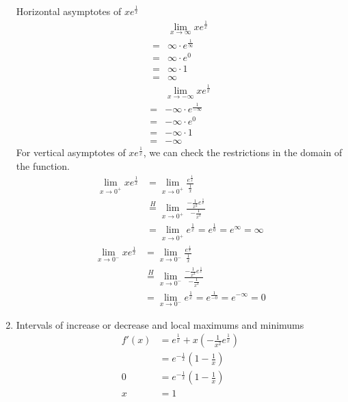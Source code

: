 \documentclass{article}
\theoremstyle{mytheoremstyle}
\theoremstyle{mytheoremstyle}
\theoremstyle{myproblemstyle}
\newcommand\lH{\stackrel{H}{=}}
\begin{document}
\begin{enumerate}
            Horizontal asymptotes of $xe^{\frac{1}{x}}$
            \begin{align*}
                &\lim_{x\to \infty} xe^{\frac{1}{x}} \\
                =& \infty\cdot e^{\frac{1}{\infty}} \\
                =& \infty\cdot e^{0} \\
                =& \infty\cdot 1 \\
                =& \infty
            \end{align*}
            \begin{align*}
                &\lim_{x\to -\infty} xe^{\frac{1}{x}} \\
                =& -\infty\cdot e^{\frac{1}{-\infty}} \\
                =& -\infty\cdot e^{0} \\
                =& -\infty\cdot 1 \\
                =& -\infty
            \end{align*}
            For vertical asymptotes of $xe^{\frac{1}{x}}$, we can check the restrictions
            in the domain of the function.
            \begin{align*}
                \lim_{x\to 0^+} xe^{\frac{1}{x}}
                &= \lim_{x\to 0^+} \frac{e^{\frac{1}{x}}}{\frac{1}{x}} \\
                &\lH\lim_{x\to 0^+} \frac{-\frac{1}{x^2}e^{\frac{1}{x}}}{-\frac{1}{x^2}} \\
                &= \lim_{x\to 0^+} e^{\frac{1}{x}} = e^{\frac{1}{0}} = e^\infty = \infty
            \end{align*}
            \begin{align*}
                \lim_{x\to 0^-} xe^{\frac{1}{x}}
                &= \lim_{x\to 0^-} \frac{e^{\frac{1}{x}}}{\frac{1}{x}} \\
                &\lH\lim_{x\to 0^-} \frac{-\frac{1}{x^2}e^{\frac{1}{x}}}{-\frac{1}{x^2}} \\
                &= \lim_{x\to 0^-} e^{\frac{1}{x}} = e^{\frac{1}{-0}} = e^{-\infty} = 0
            \end{align*}

        \item Intervals of increase or decrease and local maximums and minimums
            \begin{align*}
                f'(x)&=  e^{\frac{1}{x}} + x(-\frac{1}{x^2} e^{\frac{1}{x}}) \\
                     &=  e^{-\frac{1}{x}} (1-\frac{1}{x}) \\
                0    &=  e^{-\frac{1}{x}} (1-\frac{1}{x}) \\
                x &= 1
            \end{align*}


\end{enumerate}
\end{document}
